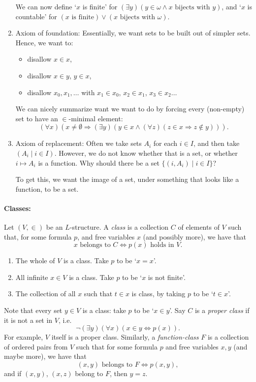 \documentclass[12pt]{article}
\begin{document}
\begin{enumerate}[resume]
		We can now define `$x$ is finite' for $(\exists y)(y \in \omega \wedge x \text{ bijects with } y)$, and `$x$ is countable' for $(x \text{ is finite}) \vee (x \text{ bijects with } \omega)$.
	\item Axiom of foundation: Essentially, we want sets to be built out of simpler sets. Hence, we want to:
		\begin{itemize}
			\item disallow $x \in x$,
			\item disallow $x \in y$, $y \in x$,
			\item disallow $x_0, x_1, \ldots$ with $x_1 \in x_0$, $x_2 \in x_1$, $x_3 \in x_2 \ldots$
		\end{itemize}
		We can nicely summarize want we want to do by forcing every (non-empty) set to have an $\in$-minimal element:
		\[
			(\forall x)(x \neq \emptyset \Rightarrow (\exists y)(y \in x \wedge (\forall z)(z \in x \Rightarrow z \not \in y))).
		\]
	\item Axiom of replacement: Often we take sets $A_i$ for each $i \in I$, and then take $(A_i \mid i \in I)$. However, we do not know whether that is a set, or whether $i \mapsto A_i$ is a function. Why should there be a set $\{(i, A_i) \mid i \in I\}$?

		To get this, we want the image of a set, under something that looks like a function, to be a set.
\end{enumerate}

\paragraph{Classes:} Let $(V, \in)$ be an $L$-structure. A \emph{class} is a collection $C$ of elements of $V$ such that, for some formula $p$, and free variables $x$ (and possibly more), we have that
\[
	x \text{ belongs to } C \iff p(x) \text{ holds in } V.
\]
\begin{exbox}
	\begin{enumerate}
		\item The whole of $V$ is a class. Take $p$ to be `$x = x$'.
		\item All infinite $x \in V$ is a class. Take $p$ to be `$x$ is not finite'.
		\item The collection of all $x$ such that $t \in x$ is class, by taking $p$ to be `$t \in x$'.
	\end{enumerate}
\end{exbox}

Note that every set $y \in V$ is a class: take $p$ to be `$x \in y$'. Say $C$ is a \emph{proper class} if it is not a set in $V$, i.e.
\[
\neg (\exists y)(\forall x)(x \in y \iff p(x)).
\]
For example, $V$ itself is a proper class. Similarly, a \emph{function-class} $F$ is a collection of ordered pairs from $V$ such that for some formula $p$ and free variables $x, y$ (and maybe more), we have that 
\[
	(x, y) \text{ belongs to } F \iff p(x, y),
\]
and if $(x, y)$, $(x, z)$ belong to $F$, then $y = z$.
\end{document}
